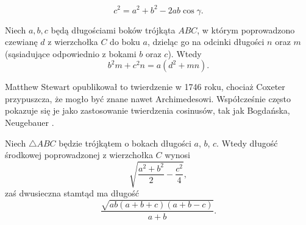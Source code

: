 \begin{proposition}
	\label{twierdzenie_cosinusow}%
	\begin{equation}
		c^2 = a^2 + b^2 - 2ab \cos \gamma.
	\end{equation}
\end{proposition}

\begin{theorem}[Stewarta, 1746]
	Niech $a, b, c$ będą długościami boków trójkąta $ABC$, w którym poprowadzono czewianę $d$ z wierzchołka $C$ do boku $a$, dzieląc go na odcinki długości $n$ oraz $m$ (sąsiadujące odpowiednio z bokami $b$ oraz $c$).
	Wtedy
	\begin{equation}
		b^2 m + c^2 n = a (d^2 + mn).
	\end{equation}
\end{theorem}

Matthew Stewart opublikował to twierdzenie w 1746 roku, chociaż Coxeter przypuszcza, że mogło być znane nawet Archimedesowi.
%
%
Współcześnie często pokazuje się je jako zastosowanie twierdzenia cosinusów, tak jak Bogdańska, Neugebauer \cite[s. 90-91]{neugebauer_2018}.	

\begin{corollary}
	Niech $\triangle ABC$ będzie trójkątem o bokach długości $a$, $b$, $c$.
	Wtedy długość środkowej poprowadzonej z wierzchołka $C$ wynosi
	\begin{equation}
		\sqrt{\frac{a^2 + b^2}{2} - \frac{c^2}{4}},
	\end{equation}
	zaś dwusieczna stamtąd ma długość
	\begin{equation}
		\frac{\sqrt{ab (a+b+c)(a+b-c)}}{a+b}.
	\end{equation}
\end{corollary}